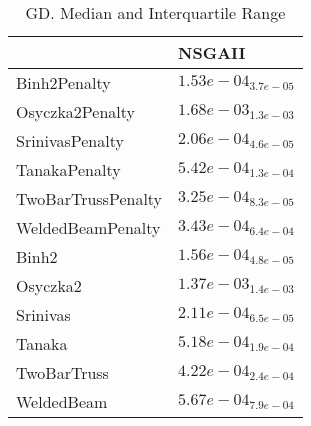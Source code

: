 \documentclass{article}
\begin{document}
\begin{table}
\caption{GD. Median and Interquartile Range}
\label{table: GD}
\centering
\begin{scriptsize}
\begin{tabular}{ll}
\hline &  NSGAII\\
\hline 
Binh2Penalty & \cellcolor{gray95}$  1.53e-04_{ 3.7e-05}$ \\
Osyczka2Penalty & \cellcolor{gray95}$  1.68e-03_{ 1.3e-03}$ \\
SrinivasPenalty & \cellcolor{gray95}$  2.06e-04_{ 4.6e-05}$ \\
TanakaPenalty & \cellcolor{gray95}$  5.42e-04_{ 1.3e-04}$ \\
TwoBarTrussPenalty & \cellcolor{gray95}$  3.25e-04_{ 8.3e-05}$ \\
WeldedBeamPenalty & \cellcolor{gray95}$  3.43e-04_{ 6.4e-04}$ \\
Binh2 & \cellcolor{gray95}$  1.56e-04_{ 4.8e-05}$ \\
Osyczka2 & \cellcolor{gray95}$  1.37e-03_{ 1.4e-03}$ \\
Srinivas & \cellcolor{gray95}$  2.11e-04_{ 6.5e-05}$ \\
Tanaka & \cellcolor{gray95}$  5.18e-04_{ 1.9e-04}$ \\
TwoBarTruss & \cellcolor{gray95}$  4.22e-04_{ 2.4e-04}$ \\
WeldedBeam & \cellcolor{gray95}$  5.67e-04_{ 7.9e-04}$ \\
\hline
\end{tabular}
\end{scriptsize}
\end{table}
\end{document}
